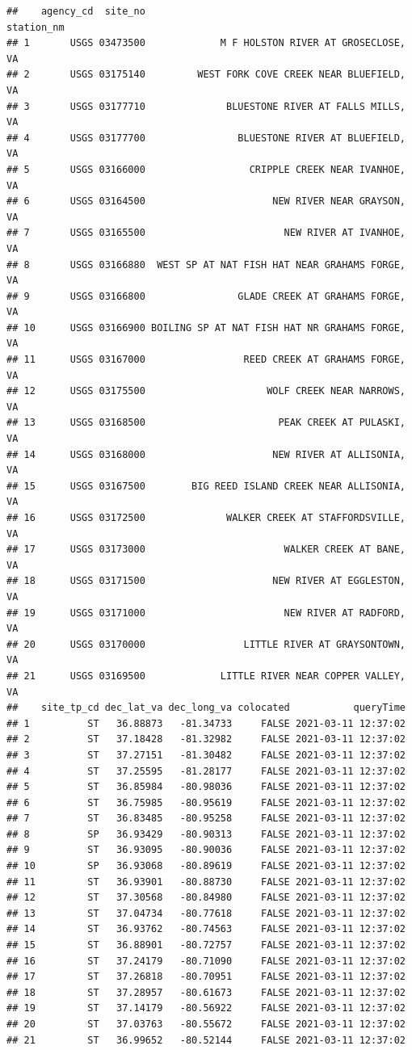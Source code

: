 \documentclass[
]{book}
\begin{document}
\begin{verbatim}
##    agency_cd  site_no                                      station_nm
## 1       USGS 03473500             M F HOLSTON RIVER AT GROSECLOSE, VA
## 2       USGS 03175140         WEST FORK COVE CREEK NEAR BLUEFIELD, VA
## 3       USGS 03177710              BLUESTONE RIVER AT FALLS MILLS, VA
## 4       USGS 03177700                BLUESTONE RIVER AT BLUEFIELD, VA
## 5       USGS 03166000                  CRIPPLE CREEK NEAR IVANHOE, VA
## 6       USGS 03164500                      NEW RIVER NEAR GRAYSON, VA
## 7       USGS 03165500                        NEW RIVER AT IVANHOE, VA
## 8       USGS 03166880  WEST SP AT NAT FISH HAT NEAR GRAHAMS FORGE, VA
## 9       USGS 03166800                GLADE CREEK AT GRAHAMS FORGE, VA
## 10      USGS 03166900 BOILING SP AT NAT FISH HAT NR GRAHAMS FORGE, VA
## 11      USGS 03167000                 REED CREEK AT GRAHAMS FORGE, VA
## 12      USGS 03175500                     WOLF CREEK NEAR NARROWS, VA
## 13      USGS 03168500                       PEAK CREEK AT PULASKI, VA
## 14      USGS 03168000                      NEW RIVER AT ALLISONIA, VA
## 15      USGS 03167500        BIG REED ISLAND CREEK NEAR ALLISONIA, VA
## 16      USGS 03172500              WALKER CREEK AT STAFFORDSVILLE, VA
## 17      USGS 03173000                        WALKER CREEK AT BANE, VA
## 18      USGS 03171500                      NEW RIVER AT EGGLESTON, VA
## 19      USGS 03171000                        NEW RIVER AT RADFORD, VA
## 20      USGS 03170000                 LITTLE RIVER AT GRAYSONTOWN, VA
## 21      USGS 03169500             LITTLE RIVER NEAR COPPER VALLEY, VA
##    site_tp_cd dec_lat_va dec_long_va colocated           queryTime
## 1          ST   36.88873   -81.34733     FALSE 2021-03-11 12:37:02
## 2          ST   37.18428   -81.32982     FALSE 2021-03-11 12:37:02
## 3          ST   37.27151   -81.30482     FALSE 2021-03-11 12:37:02
## 4          ST   37.25595   -81.28177     FALSE 2021-03-11 12:37:02
## 5          ST   36.85984   -80.98036     FALSE 2021-03-11 12:37:02
## 6          ST   36.75985   -80.95619     FALSE 2021-03-11 12:37:02
## 7          ST   36.83485   -80.95258     FALSE 2021-03-11 12:37:02
## 8          SP   36.93429   -80.90313     FALSE 2021-03-11 12:37:02
## 9          ST   36.93095   -80.90036     FALSE 2021-03-11 12:37:02
## 10         SP   36.93068   -80.89619     FALSE 2021-03-11 12:37:02
## 11         ST   36.93901   -80.88730     FALSE 2021-03-11 12:37:02
## 12         ST   37.30568   -80.84980     FALSE 2021-03-11 12:37:02
## 13         ST   37.04734   -80.77618     FALSE 2021-03-11 12:37:02
## 14         ST   36.93762   -80.74563     FALSE 2021-03-11 12:37:02
## 15         ST   36.88901   -80.72757     FALSE 2021-03-11 12:37:02
## 16         ST   37.24179   -80.71090     FALSE 2021-03-11 12:37:02
## 17         ST   37.26818   -80.70951     FALSE 2021-03-11 12:37:02
## 18         ST   37.28957   -80.61673     FALSE 2021-03-11 12:37:02
## 19         ST   37.14179   -80.56922     FALSE 2021-03-11 12:37:02
## 20         ST   37.03763   -80.55672     FALSE 2021-03-11 12:37:02
## 21         ST   36.99652   -80.52144     FALSE 2021-03-11 12:37:02
\end{verbatim}
\end{document}
